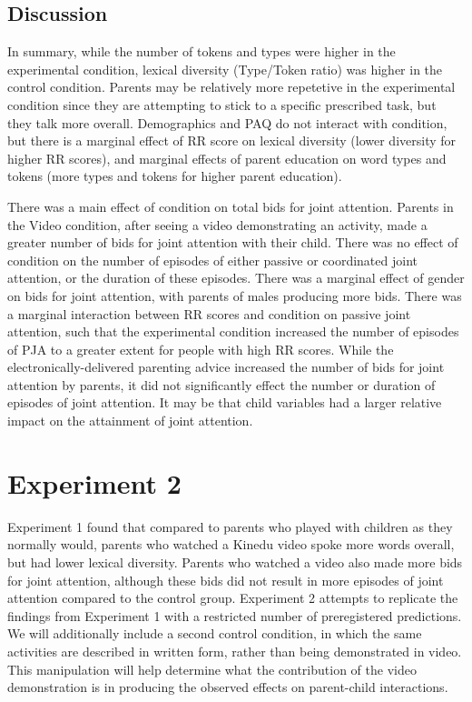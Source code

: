 \documentclass[10pt, letterpaper]{article}
\begin{document}
\subsection{Discussion}\label{discussion}

In summary, while the number of tokens and types were higher in the
experimental condition, lexical diversity (Type/Token ratio) was higher
in the control condition. Parents may be relatively more repetetive in
the experimental condition since they are attempting to stick to a
specific prescribed task, but they talk more overall. Demographics and
PAQ do not interact with condition, but there is a marginal effect of RR
score on lexical diversity (lower diversity for higher RR scores), and
marginal effects of parent education on word types and tokens (more
types and tokens for higher parent education).

There was a main effect of condition on total bids for joint attention.
Parents in the Video condition, after seeing a video demonstrating an
activity, made a greater number of bids for joint attention with their
child. There was no effect of condition on the number of episodes of
either passive or coordinated joint attention, or the duration of these
episodes. There was a marginal effect of gender on bids for joint
attention, with parents of males producing more bids. There was a
marginal interaction between RR scores and condition on passive joint
attention, such that the experimental condition increased the number of
episodes of PJA to a greater extent for people with high RR scores.
While the electronically-delivered parenting advice increased the number
of bids for joint attention by parents, it did not significantly effect
the number or duration of episodes of joint attention. It may be that
child variables had a larger relative impact on the attainment of joint
attention.

\section{Experiment 2}\label{experiment-2}

Experiment 1 found that compared to parents who played with children as
they normally would, parents who watched a Kinedu video spoke more words
overall, but had lower lexical diversity. Parents who watched a video
also made more bids for joint attention, although these bids did not
result in more episodes of joint attention compared to the control
group. Experiment 2 attempts to replicate the findings from Experiment 1
with a restricted number of preregistered predictions. We will
additionally include a second control condition, in which the same
activities are described in written form, rather than being demonstrated
in video. This manipulation will help determine what the contribution of
the video demonstration is in producing the observed effects on
parent-child interactions.
\end{document}
